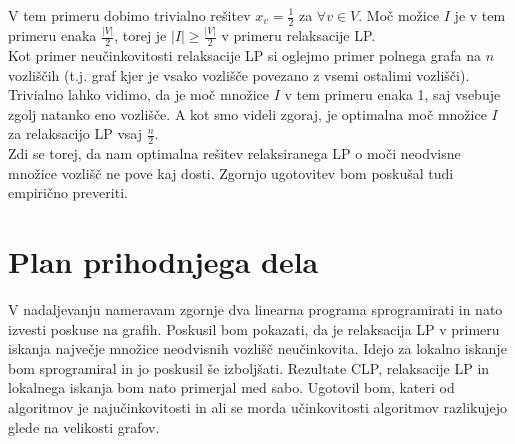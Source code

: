\documentclass[a4paper, 12 pt]{article}
\theoremstyle{plain}
\theoremstyle{definition}
\theoremstyle{remark}
\begin{document}
V tem primeru dobimo trivialno rešitev $x_v = \frac{1}{2}$ za $\forall v \in V$. Moč možice $I$ je v tem primeru enaka $\frac{|V|}{2}$, torej je  $|I| \geq \frac{|V|}{2}$ v primeru relaksacije LP. \\

Kot primer neučinkovitosti relaksacije LP si oglejmo primer polnega grafa na $n$ vozliščih (t.j. graf kjer je vsako vozlišče povezano z vsemi ostalimi vozlišči). Trivialno lahko vidimo, da je moč množice $I$ v tem primeru enaka 1, saj vsebuje zgolj natanko eno vozlišče. A kot smo videli zgoraj, je optimalna moč množice $I$ za relaksacijo LP vsaj $\frac{n}{2}$.\\

Zdi se torej, da nam optimalna rešitev relaksiranega LP o moči neodvisne množice vozlišč ne pove kaj dosti. Zgornjo ugotovitev bom poskušal tudi empirično preveriti.




	



\section{Plan prihodnjega dela}

V nadaljevanju nameravam zgornje dva linearna programa sprogramirati in nato izvesti poskuse na grafih. Poskusil bom pokazati, da je relaksacija LP v primeru iskanja največje množice neodvisnih vozlišč neučinkovita. Idejo za lokalno iskanje bom sprogramiral in jo poskusil še izboljšati. Rezultate CLP, relaksacije LP in lokalnega iskanja bom nato primerjal med sabo. Ugotovil bom, kateri od algoritmov je najučinkovitosti in ali se morda učinkovitosti algoritmov razlikujejo glede na velikosti grafov.
\end{document}
